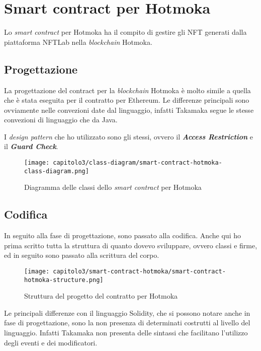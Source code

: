 
\section{Smart contract per Hotmoka}
Lo \textit{smart contract} per Hotmoka ha il compito di gestire gli NFT generati dalla piattaforma NFTLab nella \textit{blockchain} Hotmoka.

\subsection{Progettazione}
La progettazione del contract per la \textit{blockchain} Hotmoka è molto simile a quella che è stata eseguita per il contratto per Ethereum. Le differenze principali sono ovviamente nelle convezioni date dal linguaggio, infatti Takamaka segue le stesse convezioni di linguaggio che da Java. 

I \textit{design pattern} che ho utilizzato sono gli stessi, ovvero il \textbf{\textit{Access Restriction}} e il \textbf{\textit{Guard Check}}.

\begin{figure}[h!]
  \centering
  \texttt{[image: capitolo3/class-diagram/smart-contract-hotmoka-class-diagram.png]}
  \caption{Diagramma delle classi dello \textit{smart contract} per Hotmoka}
\end{figure}

\subsection{Codifica}
In seguito alla fase di progettazione, sono passato alla codifica. Anche qui ho prima scritto tutta la struttura di quanto dovevo sviluppare, ovvero classi e firme, ed in seguito sono passato alla scrittura del corpo.

\begin{figure}[h!]
  \centering
  \texttt{[image: capitolo3/smart-contract-hotmoka/smart-contract-hotmoka-structure.png]}
  \caption{Struttura del progetto del contratto per Hotmoka}
\end{figure}


Le principali differenze con il linguaggio Solidity, che si possono notare anche in fase di progettazione, sono la non presenza di determinati costrutti al livello del linguaggio. Infatti Takamaka non presenta delle sintassi che facilitano l'utilizzo degli eventi e dei modificatori.

